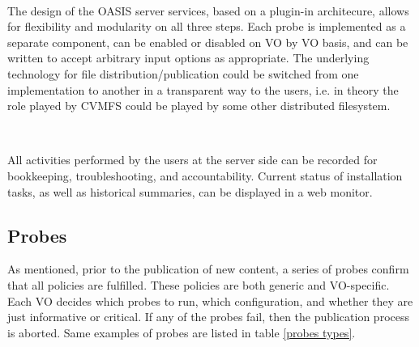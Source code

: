 \documentclass[a4paper]{jpconf}
\begin{document}
~

The design of the OASIS server services, 
based on a plugin-in architecure, 
allows for flexibility and modularity on all three steps. 
Each probe is implemented as a separate component, 
can be enabled or disabled on VO by VO basis, 
and can be written to accept arbitrary input options as appropriate. 
The underlying technology for file distribution/publication could be switched 
from one implementation to another in a transparent way to the users, i.e. in
theory the role played by CVMFS could be played by some other distributed
filesystem. 

~

All activities performed by the users at the server side 
can be recorded for bookkeeping, troubleshooting, and accountability. 
Current status of installation tasks, as well as historical summaries, 
can be displayed in a web monitor. 


\subsection{Probes}

As mentioned, prior to the publication of new content, 
a series of probes confirm that all policies are fulfilled. 
These policies are both generic and VO-specific.
Each VO decides which probes to run, which configuration, 
and whether they are just informative or critical.
If any of the probes fail, then the publication process is aborted. 
Same examples of probes are listed in table \ref{probes types}.

~
\end{document}
